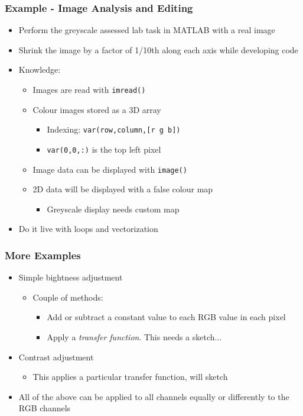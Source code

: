\documentclass[14pt]{beamer}
\begin{document}
\begin{frame}
\frametitle{Example - Image Analysis and Editing}
\begin{itemize}
\item Perform the greyscale assessed lab task in MATLAB with a real image
\item Shrink the image by a factor of 1/10th along each axis while developing code
\item Knowledge:
	\begin{itemize}
		\item Images are read with \texttt{imread()}
		\item Colour images stored as a 3D array
			\begin{itemize}
				\item Indexing: \texttt{var(row,column,[r g b])}
				\item \texttt{var(0,0,:)} is the top left pixel
			\end{itemize}
		\item Image data can be displayed with \texttt{image()}
		\item 2D data will be displayed with a false colour map
			\begin{itemize}
				\item Greyscale display needs custom map
			\end{itemize}
	\end{itemize}

\item Do it live with loops and vectorization
\end{itemize}
\end{frame}

\begin{frame}
\frametitle{More Examples}
\begin{itemize}
\item Simple bightness adjustment
	\begin{itemize}
		\item Couple of methods:
			\begin{itemize}
				\item Add or subtract a constant value to each RGB value in each pixel
				\item Apply a \textit{transfer function}. This needs a sketch...
			\end{itemize}
	\end{itemize}
\item Contrast adjustment
	\begin{itemize}
		\item This applies a particular transfer function, will sketch
	\end{itemize}
\item All of the above can be applied to all channels equally or differently to the RGB channels
\end{itemize}
\end{frame}
\end{document}
